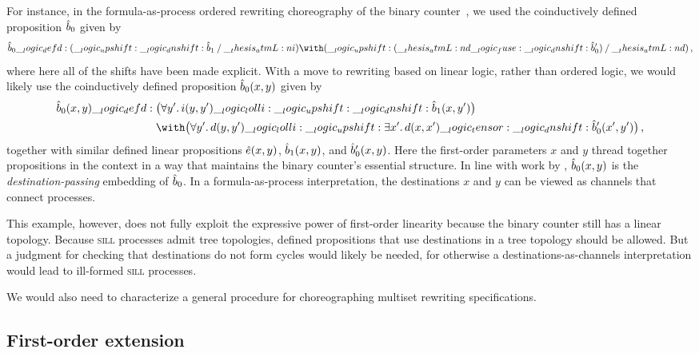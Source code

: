 For instance, in the formula-as-process ordered rewriting choreography of the binary counter~, we used the coinductively defined proposition $\hat{b}_0$ given by 
\begin{equation*}
  \defp{b}_0 \defd (\up \dn \defp{b}_1 \pmir \atmL{i}) \with (\up (\atmL{d} \fuse \dn \defp{b}'_0) \pmir \atmL{d})
  \,,
\end{equation*}
where here all of the shifts have been made explicit.
With a move to rewriting based on linear logic, rather than ordered logic, we would likely use the coinductively defined proposition $\hat{b}_0(x, y)$ given by
\begin{equation*}
  \defp{b}_0(x, y) \defd
    \begin{lgathered}[t]
      \bigl(\forall y'.\, i(y, y') \lolli \up \dn \defp{b}_1(x, y')\bigr) \\
      {} \with \bigl(\forall y'.\, d(y, y') \lolli \up \exists x'.\, d(x, x') \tensor \dn \defp{b}'_0(x', y')\bigr)
    \,,
    \end{lgathered}
\end{equation*}
together with similar defined linear propositions $\hat{e}(x, y)$, $\hat{b}_1(x, y)$, and $\hat{b}'_0(x, y)$.
Here the first-order parameters $x$ and $y$ thread together propositions in the context in a way that maintains the binary counter's essential structure.
In line with work by \textcite{Simmons+Pfenning:??}, $\hat{b}_0(x, y)$ is the \emph{destination-passing} embedding of $\hat{b}_0$.
In a formula-as-process interpretation, the destinations $x$ and $y$ can be viewed as channels that connect processes.

This example, however, does not fully exploit the expressive power of first-order linearity because the binary counter still has a linear topology.
Because \textsc{sill} processes admit tree topologies, defined propositions that use destinations in a tree topology should be allowed.
But a judgment for checking that destinations do not form cycles would likely be needed, for otherwise a destinations-as-channels interpretation would lead to ill-formed \textsc{sill} processes.

We would also need to characterize a general procedure for choreographing multiset rewriting specifications.%


\subsection{First-order extension}

